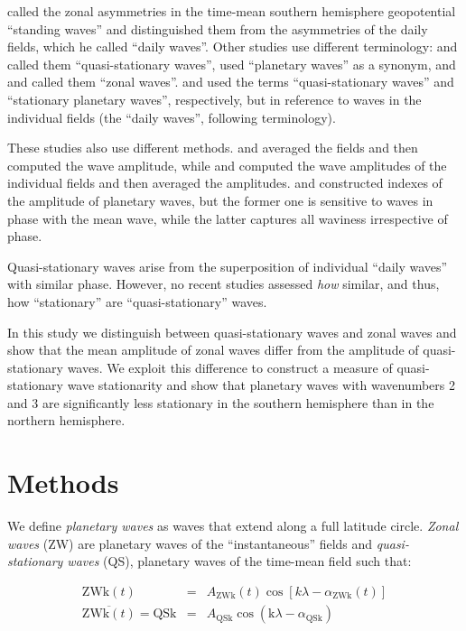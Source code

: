 \documentclass[draft,linenumbers]{agujournal2018}
\begin{document}
\citet{Loon1972} called the zonal asymmetries in the time-mean southern
hemisphere geopotential ``standing waves'' and distinguished them from
the asymmetries of the daily fields, which he called ``daily waves''.
Other studies use different terminology: \citet{Quintanar1995a} and
\citet{Rao2004} called them ``quasi-stationary waves'',
\citet{Turner2017} used ``planetary waves'' as a synonym, and
\citet{Raphael2004} and \citet{Irving2015} called them ``zonal waves''.
\citet{Kravchenko2012} and \citet{Lastovicka2018} used the terms
``quasi-stationary waves'' and ``stationary planetary waves'',
respectively, but in reference to waves in the individual fields (the
``daily waves'', following \citet{Loon1972} terminology).

These studies also use different methods. \citet{Loon1972} and
\citet{Quintanar1995a} averaged the fields and then computed the wave
amplitude, while \citet{Rao2004} and \citet{Turner2017} computed the
wave amplitudes of the individual fields and then averaged the
amplitudes. \citet{Raphael2004} and \citet{Irving2015} constructed
indexes of the amplitude of planetary waves, but the former one is
sensitive to waves in phase with the mean wave, while the latter
captures all waviness irrespective of phase.

Quasi-stationary waves arise from the superposition of individual
``daily waves'' with similar phase. However, no recent studies assessed
\emph{how} similar, and thus, how ``stationary'' are
``quasi-stationary'' waves.

In this study we distinguish between quasi-stationary waves and zonal
waves and show that the mean amplitude of zonal waves differ from the
amplitude of quasi-stationary waves. We exploit this difference to
construct a measure of quasi-stationary wave stationarity and show that
planetary waves with wavenumbers 2 and 3 are significantly less
stationary in the southern hemisphere than in the northern hemisphere.

\section{Methods}

We define \emph{planetary waves} as waves that extend along a full
latitude circle. \emph{Zonal waves} (ZW) are planetary waves of the
``instantaneous'' fields and \emph{quasi-stationary waves} (QS),
planetary waves of the time-mean field such that:

\begin{linenomath*}
\begin{eqnarray}\label{eq:ZW}
\mathrm{ZWk}(t) & = & A_\mathrm{ZWk}(t)\cos \left [ k\lambda - \alpha_\mathrm{ZWk}(t) \right ] \\ 
\overline{\mathrm{ZWk}(t)} = \mathrm{QSk} & = & A_\mathrm{QSk}\cos \left (  \mathrm{k}\lambda - \alpha_\mathrm{QSk} \right ) \label{eq:QS}
\end{eqnarray}
\end{linenomath*}
\end{document}
